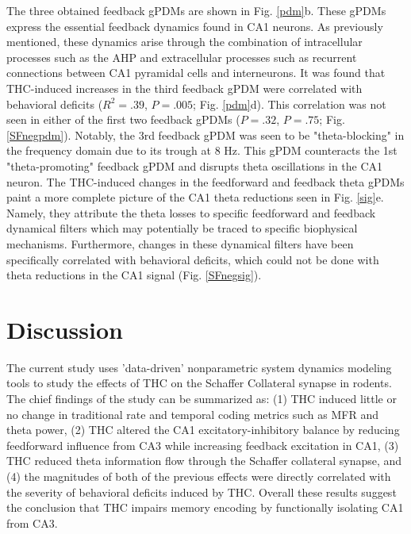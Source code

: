 \documentclass[11pt,a4paper,final]{article}
\begin{document}
The three obtained feedback gPDMs are shown in Fig. \ref{pdm}b.
These gPDMs express the essential feedback dynamics found in CA1 neurons.
As previously mentioned, these dynamics arise through the combination of intracellular processes such as the AHP and extracellular processes such as recurrent connections between CA1 pyramidal cells and interneurons.
It was found that THC-induced increases in the third feedback gPDM were correlated with behavioral deficits ($R^2=.39$, $P=.005$; Fig. \ref{pdm}d).
This correlation was not seen in either of the first two feedback gPDMs ($P=.32$, $P=.75$; Fig. \ref{SFnegpdm}).
Notably, the 3rd feedback gPDM was seen to be "theta-blocking" in the frequency domain due to its trough at 8 Hz. 
This gPDM counteracts the 1st "theta-promoting" feedback gPDM and disrupts theta oscillations in the CA1 neuron.
The THC-induced changes in the feedforward and feedback theta gPDMs paint a more complete picture of the CA1 theta reductions seen in Fig. \ref{sig}e.
Namely, they attribute the theta losses to specific feedforward and feedback dynamical filters which may potentially be traced to specific biophysical mechanisms.
Furthermore, changes in these dynamical filters have been specifically correlated with behavioral deficits, which could not be done with theta reductions in the CA1 signal (Fig. \ref{SFnegsig}).

\section{Discussion \label{disc}}

The current study uses 'data-driven' nonparametric system dynamics modeling tools to study the effects of THC on the Schaffer Collateral synapse in rodents.
The chief findings of the study can be summarized as:
(1) THC induced little or no change in traditional rate and temporal coding metrics such as MFR and theta power, 	
(2) THC altered the CA1 excitatory-inhibitory balance by reducing feedforward influence from CA3 while increasing feedback excitation in CA1,
(3) THC reduced theta information flow through the Schaffer collateral synapse,
and (4) the magnitudes of both of the previous effects were directly correlated with the severity of behavioral deficits induced by THC.
Overall these results suggest the conclusion that THC impairs memory encoding by functionally isolating CA1 from CA3.
\end{document}

